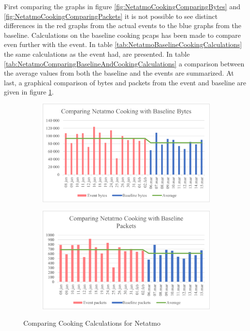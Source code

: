 First comparing the graphs in figure \ref{fig:NetatmoCookingComparingBytes} and \ref{fig:NetatmoCookingComparingPackets} it is not possible to see distinct differences in the red graphs from the actual events to the blue graphs from the baseline. Calculations on the baseline cooking pcaps has been made to compare even further with the event. In table \ref{tab:NetatmoBaselineCookingCalculations} the same calculations as the event had, are presented. In table \ref{tab:NetatmoComparingBaselineAndCookingCalculations} a comparison between the average values from both the baseline and the events are summarized. At last, a graphical comparison of bytes and packets from the event and baseline are given in figure \ref{fig:NetatmoComparingCookingCalculations}. 



\begin{figure}[H]
    \centering
    \begin{subfigure}{0.49\textwidth}
        \centering
        \includegraphics[width=1\hsize]{figures/Netatmo_Comparing_Cooking_Calculations_Bytes.png} 
    \end{subfigure}
    \begin{subfigure}{0.49\textwidth}
        \centering
        \includegraphics[width=1\hsize]{figures/Netatmo_Comparing_Cooking_Calculations_Packets.png} 
    \end{subfigure}
    \caption{Comparing Cooking Calculations for Netatmo}
    \label{fig:NetatmoComparingCookingCalculations}
\end{figure}


